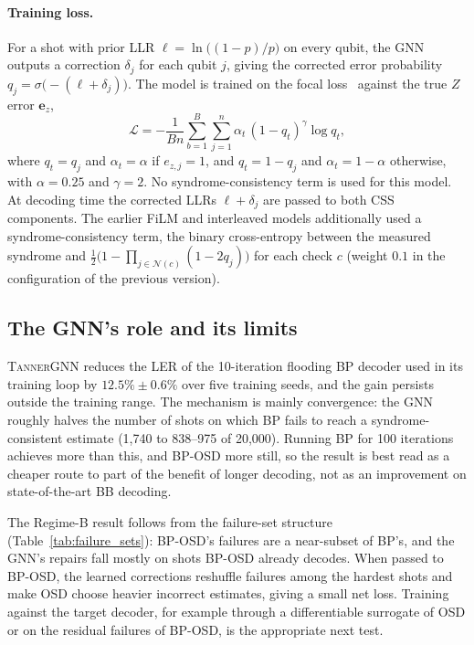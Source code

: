 \paragraph{Training loss.} For a shot with prior LLR
$\ell=\ln\bigl((1-p)/p\bigr)$ on every qubit, the GNN outputs a correction
$\delta_j$ for each qubit $j$, giving the corrected error probability
$q_j=\sigma\bigl(-(\ell+\delta_j)\bigr)$. The model is trained on the
focal loss~\cite{Lin2017Focal} against the true $Z$ error
$\mathbf{e}_z$,
\begin{equation}
\mathcal{L}=-\frac{1}{Bn}\sum_{b=1}^{B}\sum_{j=1}^{n}
\alpha_{t}\,(1-q_{t})^{\gamma}\log q_{t},
\label{eq:loss}
\end{equation}
where $q_t=q_j$ and $\alpha_t=\alpha$ if $e_{z,j}=1$, and
$q_t=1-q_j$ and $\alpha_t=1-\alpha$ otherwise, with $\alpha=0.25$ and $\gamma=2$. No syndrome-consistency term is used
for this model. At decoding time the corrected LLRs $\ell+\delta_j$ are
passed to both CSS components. The earlier FiLM and interleaved models
additionally used a syndrome-consistency term, the binary cross-entropy
between the measured syndrome and
$\tfrac12\bigl(1-\prod_{j\in\mathcal N(c)}(1-2q_j)\bigr)$ for each check
$c$ (weight $0.1$ in the configuration of the previous version).

\subsection{The GNN's role and its limits}

\textsc{TannerGNN} reduces the LER of the 10-iteration flooding BP
decoder used in its training loop by $12.5\%\pm0.6\%$ over five training
seeds, and the gain persists outside the training range. The mechanism is
mainly convergence: the GNN roughly halves the number of shots on which BP
fails to reach a syndrome-consistent estimate (1{,}740 to 838--975 of
20{,}000). Running BP for 100 iterations achieves more than this, and
BP-OSD more still, so the result is best read as a cheaper route to part
of the benefit of longer decoding, not as an improvement on
state-of-the-art BB decoding.

The Regime-B result follows from the failure-set structure
(Table~\ref{tab:failure_sets}): BP-OSD's failures are a near-subset of
BP's, and the GNN's repairs fall mostly on shots BP-OSD already decodes.
When passed to BP-OSD, the learned corrections reshuffle failures among
the hardest shots and make OSD choose heavier incorrect estimates, giving
a small net loss. Training against the target decoder, for example
through a differentiable surrogate of OSD or on the residual failures of
BP-OSD, is the appropriate next test.

